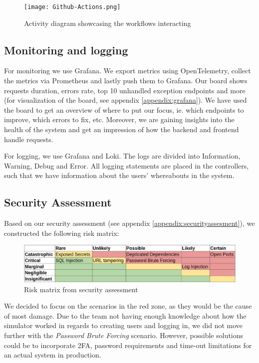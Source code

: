 \begin{figure}[H]
    \centering
    \texttt{[image: Github-Actions.png]}
    \caption{Activity diagram showcasing the workflows interacting }
    \label{fig:workflows}
\end{figure}

\subsection{Monitoring and logging}
For monitoring we use Grafana. We export metrics using OpenTelemetry, collect the metrics via Prometheus and lastly push them to Grafana. Our board shows requests duration, errors rate, top 10 unhandled exception endpoints and more (for visualization of the board, see appendix \ref{appendix:grafana}). We have used the board to get an overview of where to put our focus, ie. which endpoints to improve, which errors to fix, etc. Moreover, we are gaining insights into the health of the system and get an impression of how the backend and frontend handle requests.

For logging, we use Grafana and Loki. The logs are divided into Information, Warning, Debug and Error. All logging statements are placed in the controllers, such that we have information about the users' whereabouts in the system.

\subsection{Security Assessment}
Based on our security assessment (see appendix \ref{appendix:securityassesment}), we constructed the following risk matrix:
\begin{figure}[H]
    \centering
    \includegraphics[width=1\linewidth]{images/risk-matrix.png}
    \caption{Risk matrix from security assessment}
    \label{fig:enter-label}
\end{figure}
We decided to focus on the scenarios in the red zone, as they would be the cause of most damage. Due to the team not having enough knowledge about how the simulator worked in regards to creating users and logging in, we did not move further with the \textit{Password Brute Forcing} scenario. However, possible solutions could be to incorporate 2FA, password requirements and time-out limitations for an actual system in production.

